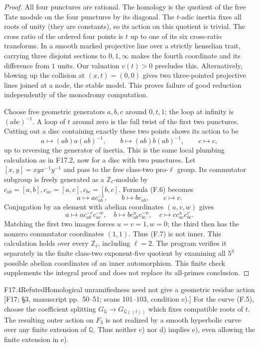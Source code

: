 \begin{proof}
All four punctures are rational. The homology is the quotient of
the free Tate module on the four punctures by its diagonal. The
$t$-adic inertia fixes all roots of unity (they are constants), so
its action on this quotient is trivial. The cross ratio of the
ordered four points is $t$ up to one of its six cross-ratio
transforms. In a smooth marked projective line over a strictly
henselian trait, carrying three disjoint sections to $0,1,\infty$
makes the fourth coordinate and its difference from $1$ units.
Our valuation $v(t)>0$ precludes this. Alternatively, blowing up
the collision at $(x,t)=(0,0)$ gives two three-pointed projective
lines joined at a node, the stable model. This proves failure of
good reduction independently of the monodromy computation.

Choose free geometric generators $a,b,c$ around $0,t,1$; the loop
at infinity is $(abc)^{-1}$. A loop of $t$ around zero is the full
twist of the first two punctures. Cutting out a disc containing
exactly these two points shows its action to be
\[
 a\longmapsto(ab)a(ab)^{-1},\qquad
 b\longmapsto(ab)b(ab)^{-1},\qquad c\longmapsto c,             \tag{F.6}
\]
up to reversing the generator of inertia. This is the same local
plumbing calculation as in F17.2, now for a disc with two punctures.
Let $[x,y]=xyx^{-1}y^{-1}$ and pass to the free class-two pro-$\ell$
group. Its commutator subgroup is freely generated as a
$\mathbb Z_\ell$-module by
$c_{ab}=[a,b],c_{ac}=[a,c],c_{bc}=[b,c]$. Formula (F.6) becomes
\[
 a\mapsto a c_{ab}^{-1},\qquad
 b\mapsto b c_{ab},\qquad c\mapsto c.                       \tag{F.7}
\]
Conjugation by an element with abelian coordinates $(u,v,w)$ gives
\[
 a\mapsto a c_{ab}^{-v}c_{ac}^{-w},\quad
 b\mapsto b c_{ab}^{u}c_{bc}^{-w},\quad
 c\mapsto c c_{ac}^{u}c_{bc}^{v}.
\]
Matching the first two images forces $u=v=1,w=0$; the third then
has the nonzero commutator coordinates $(1,1)$. Thus (F.7) is not
inner. This calculation holds over every $\mathbb Z_\ell$, including
$\ell=2$. The program verifies it separately in the finite class-two
exponent-five quotient by examining all $5^3$ possible abelian
coordinates of an inner automorphism. This finite check supplements
the integral proof and does not replace its all-primes conclusion.
\end{proof}

\begin{result}{F17.4}{Refuted}{Homological unramifiedness need not give a geometric residue action}
\textup{[F17; \S3, manuscript pp.\ 50--51; scans 101--103, condition e).]}
For the curve (F.5), choose the coefficient splitting
$G_{\mathbb Q}\to G_{\mathbb Q((t))}$ which fixes compatible roots
of $t$. The resulting outer action on $\widehat F_3$ is not realized
by a smooth hyperbolic curve over any finite extension of
$\mathbb Q$. Thus neither c) nor d) implies e), even allowing the
finite extension in e).
\end{result}

